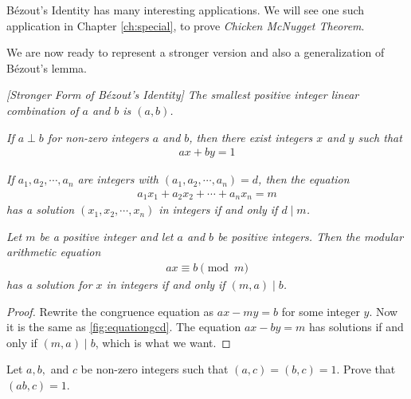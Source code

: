\documentclass{subfile}
\begin{document}
	B\'{e}zout's Identity has many interesting applications. We will see one such application in Chapter \ref{ch:special}, to prove \textit{Chicken McNugget Theorem}.

	We are now ready to represent a stronger version and also a generalization of B\'{e}zout's lemma.

	\begin{corollary} \slshape  [Stronger Form of B\'{e}zout's Identity]\label{cor:strongbezout}
		The smallest positive integer linear combination of $a$ and $b$ is $(a,b)$.
	\end{corollary}

	\begin{corollary} \slshape \label{cor:bezoutcoprime}
		If $a \perp b$ for non-zero integers $a$ and $b$, then there exist integers $x$ and $y$ such that
		\begin{align*}
		ax+by=1
		\end{align*}
	\end{corollary}

	\begin{theorem}  \slshape
		If $a_1, a_2, \cdots, a_n$ are integers with $(a_1, a_2, \cdots, a_n)=d$, then the equation
		\begin{align*}
		a_1x_1 + a_2x_2 + \cdots + a_n x_n = m
		\end{align*}
		has a solution $(x_1, x_2, \cdots, x_n)$ in integers if and only if $d\mid m$.
	\end{theorem}

	\begin{theorem}\slshape\label{thm:ax=b}
		Let $m$ be a positive integer and let $a$ and $b$ be positive integers. Then the modular arithmetic equation
		\begin{align*} ax \equiv b \pmod m\end{align*}
		has a solution for $x$ in integers if and only if $(m,a)\mid b$.
	\end{theorem}

	\begin{proof}
		Rewrite the congruence equation as $ax-my = b$ for some integer $y$. Now it is the same as \autoref{fig:equationgcd}. The equation $ax-by=m$ has solutions if and only if $(m,a)\mid b$, which is what we want.
	\end{proof}

	\begin{problem}
		Let $a,b,$ and $c$ be non-zero integers such that $(a, c)=(b,c)=1$. Prove that $(ab,c)=1$.
	\end{problem}
\end{document}
